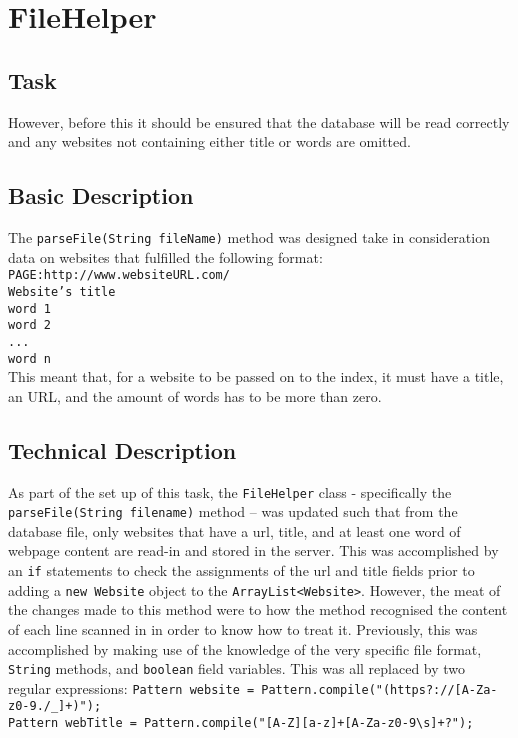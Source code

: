 \chapter{FileHelper}

\section{Task}
However, before this it should be ensured that the database will be read correctly and any websites not containing either title or words are omitted.

\section{Basic Description}
The {\tt parseFile(String fileName)} method was designed take in consideration data on websites that fulfilled the following format:\\
{\tt *PAGE:http://www.websiteURL.com/}\\
{\tt Website's title}\\
{\tt word 1}\\
{\tt word 2}\\
{\tt ...}\\
{\tt word n}\\
This meant that, for a website to be passed on to the index, it must have a title, an URL, and the amount of words has to be more than zero.

\section{Technical Description}
As part of the set up of this task, the {\tt FileHelper} class - specifically the \\ {\tt parseFile(String filename)} method – was updated such that from the database file, only websites that have a url, title, and at least one word of webpage content are read-in and stored in the server.
This was accomplished by an {\tt if} statements to check the assignments of the url and title fields prior to adding a {\tt new Website} object to the {\tt ArrayList<Website>}. However, the meat of the changes made to this method were to how the method recognised the content of each line scanned in in order to know how to treat it.
Previously, this was accomplished by making use of the knowledge of the very specific file format, {\tt String} methods, and {\tt boolean} field variables.
This was all replaced by two regular expressions:
{\tt Pattern website = Pattern.compile("(https?://[A-Za-z0-9./\_]+)");} \\
{\tt Pattern webTitle = Pattern.compile("[A-Z][a-z]+[A-Za-z0-9\textbackslash s]+?");} \\


